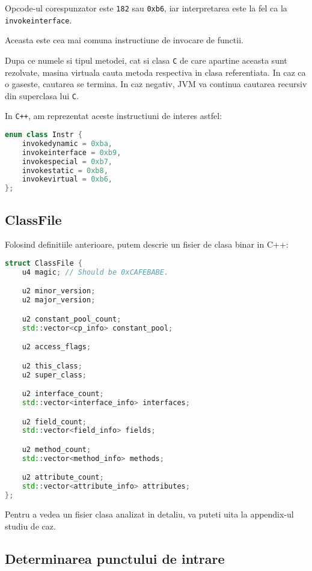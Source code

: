 Opcode-ul corespunzator este \texttt{182} sau \texttt{0xb6}, iar
interpretarea este la fel ca la \texttt{invokeinterface}.

Aceasta este cea mai comuna instructiune de invocare de functii.

Dupa ce numele si tipul metodei, cat si clasa \texttt{C} de care
apartine aceasta sunt rezolvate, masina virtuala cauta metoda respectiva
in clasa referentiata. In caz ca o gaseste, cautarea se termina. In caz
negativ, JVM va continua cautarea recursiv din superclasa lui
\texttt{C}.

In \texttt{C++}, am reprezentat aceste instructiuni de interes astfel:

\begin{lstlisting}[language=C++]
enum class Instr {
    invokedynamic = 0xba,
    invokeinterface = 0xb9,
    invokespecial = 0xb7,
    invokestatic = 0xb8,
    invokevirtual = 0xb6,
};
\end{lstlisting}

\subsection{ClassFile}\label{classfile}

Folosind definitiile anterioare, putem descrie un fisier de clasa binar
in C++:

\begin{lstlisting}[language=C++]
struct ClassFile {
    u4 magic; // Should be 0xCAFEBABE.

    u2 minor_version;
    u2 major_version;

    u2 constant_pool_count;
    std::vector<cp_info> constant_pool;

    u2 access_flags;

    u2 this_class;
    u2 super_class;

    u2 interface_count;
    std::vector<interface_info> interfaces;

    u2 field_count;
    std::vector<field_info> fields;

    u2 method_count;
    std::vector<method_info> methods;

    u2 attribute_count;
    std::vector<attribute_info> attributes;
};
\end{lstlisting}

Pentru a vedea un fisier clasa analizat in detaliu, va puteti
uita la appendix-ul studiu de caz.

\subsection{Determinarea punctului de intrare}

